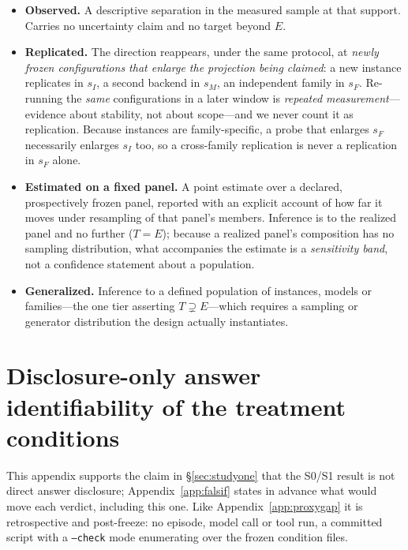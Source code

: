 \documentclass{article}
\begin{document}
\begin{itemize}
\item \textbf{Observed.} A descriptive separation in the measured sample at that support. Carries no uncertainty claim and no target beyond $E$.
\item \textbf{Replicated.} The direction reappears, under the same protocol, at \emph{newly frozen configurations that enlarge the projection being claimed}: a new instance replicates in $s_I$, a second backend in $s_M$, an independent family in $s_F$. Re-running the \emph{same} configurations in a later window is \emph{repeated measurement}---evidence about stability, not about scope---and we never count it as replication. Because instances are family-specific, a probe that enlarges $s_F$ necessarily enlarges $s_I$ too, so a cross-family replication is never a replication in $s_F$ alone.
\item \textbf{Estimated on a fixed panel.} A point estimate over a declared, prospectively frozen panel, reported with an explicit account of how far it moves under resampling of that panel's members. Inference is to the realized panel and no further ($T=E$); because a realized panel's composition has no sampling distribution, what accompanies the estimate is a \emph{sensitivity band}, not a confidence statement about a population.
\item \textbf{Generalized.} Inference to a defined population of instances, models or families---the one tier asserting $T\supsetneq E$---which requires a sampling or generator distribution the design actually instantiates.
\end{itemize}

\section{Disclosure-only answer identifiability of the treatment conditions}
\label{app:ident}
This appendix supports the claim in \S\ref{sec:studyone} that the S0/S1 result is not direct answer disclosure; Appendix~\ref{app:falsif} states in advance what would move each verdict, including this one. Like Appendix~\ref{app:proxygap} it is retrospective and post-freeze: no episode, model call or tool run, a committed script with a \texttt{--check} mode enumerating over the frozen condition files.
\end{document}
